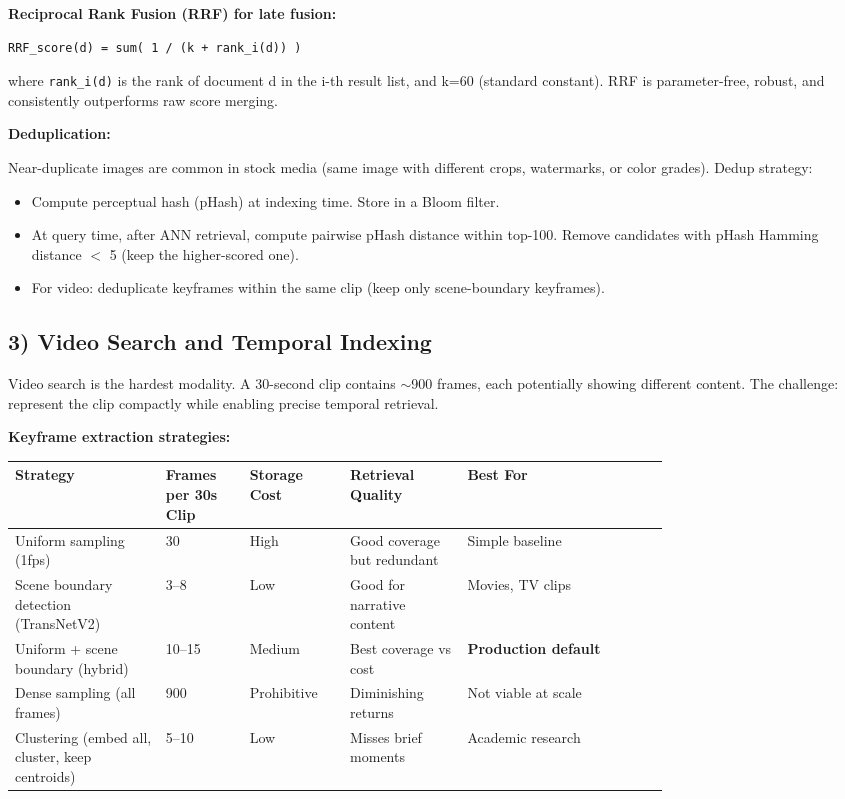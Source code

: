 \textbf{Reciprocal Rank Fusion (RRF) for late fusion:}

\begin{verbatim}
RRF_score(d) = sum( 1 / (k + rank_i(d)) )
\end{verbatim}

where \texttt{rank\_i(d)} is the rank of document d in the i-th result list, and k=60 (standard constant). RRF is parameter-free, robust, and consistently outperforms raw score merging.

\textbf{Deduplication:}

Near-duplicate images are common in stock media (same image with different crops, watermarks, or color grades). Dedup strategy:
\begin{itemize}
  \item Compute perceptual hash (pHash) at indexing time. Store in a Bloom filter.
  \item At query time, after ANN retrieval, compute pairwise pHash distance within top-100. Remove candidates with pHash Hamming distance $<$ 5 (keep the higher-scored one).
  \item For video: deduplicate keyframes within the same clip (keep only scene-boundary keyframes).
\end{itemize}

\subsection*{3) Video Search and Temporal Indexing}

Video search is the hardest modality. A 30-second clip contains $\sim$900 frames, each potentially showing different content. The challenge: represent the clip compactly while enabling precise temporal retrieval.

\textbf{Keyframe extraction strategies:}

\begin{tabular}{|p{0.18\linewidth}|p{0.10\linewidth}|p{0.10\linewidth}|p{0.14\linewidth}|p{0.24\linewidth}|}
\hline
\textbf{Strategy} & \textbf{Frames per 30s Clip} & \textbf{Storage Cost} & \textbf{Retrieval Quality} & \textbf{Best For} \\
\hline
Uniform sampling (1fps) & 30 & High & Good coverage but redundant & Simple baseline \\
\hline
Scene boundary detection (TransNetV2) & 3--8 & Low & Good for narrative content & Movies, TV clips \\
\hline
Uniform + scene boundary (hybrid) & 10--15 & Medium & Best coverage vs cost & \textbf{Production default} \\
\hline
Dense sampling (all frames) & 900 & Prohibitive & Diminishing returns & Not viable at scale \\
\hline
Clustering (embed all, cluster, keep centroids) & 5--10 & Low & Misses brief moments & Academic research \\
\hline
\end{tabular}


